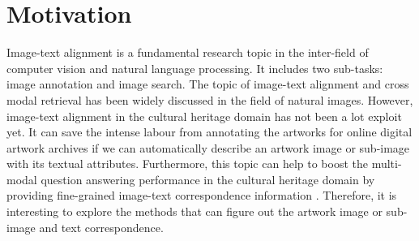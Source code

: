 



\section{Motivation}
Image-text alignment is a fundamental research topic in the inter-field of computer vision and natural language processing. It includes two sub-tasks: image annotation and image search. The topic of image-text alignment and cross modal retrieval has been widely discussed in the field of natural images. However, image-text alignment in the cultural heritage domain has not been a lot exploit yet. It can save the intense labour from annotating the artworks for online digital artwork archives if we can automatically describe an artwork image or sub-image with its textual attributes. Furthermore, this topic can help to boost the multi-modal question answering performance in the cultural heritage domain by providing fine-grained image-text correspondence information \cite{mqa}. Therefore, it is interesting to explore the methods that can figure out the artwork image or sub-image and text correspondence.

